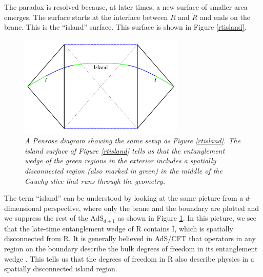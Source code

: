 \documentclass[12pt]{article}
\begin{document}
The paradox is resolved because, at later times, a new surface of smaller area emerges.  The surface starts at the interface between $R$ and $\widetilde{R}$ and ends on the brane. This is the ``island'' surface. This surface is shown in Figure \ref{rtisland}.

\begin{figure}[!ht]
\begin{center}
\includegraphics[width=0.7\textwidth]{island.pdf}
\caption{\em A Penrose diagram showing the  same setup as Figure \ref{rtisland}. The island surface of Figure \ref{rtisland} tells us that the entanglement wedge of the green regions in the exterior includes a spatially disconnected region (also marked in green) in the middle of the Cauchy slice that runs through the geometry. \label{dualisland}}
\end{center}
\end{figure}

The term ``island'' can be understood by looking at the same picture from a  $d$-dimensional perspective, where only the brane and the boundary are plotted and we suppress the rest of the AdS$_{d+1}$ as shown in Figure \ref{dualisland}. In this picture, we see that the late-time entanglement wedge of R contains I, which is spatially disconnected from R. It is generally believed in AdS/CFT that operators in any region on the boundary describe the bulk degrees of freedom in its entanglement wedge \cite{Czech:2012bh,Dong:2016eik}. This tells us that the degrees of freedom in R also describe physics in a spatially disconnected island region.
\end{document}
